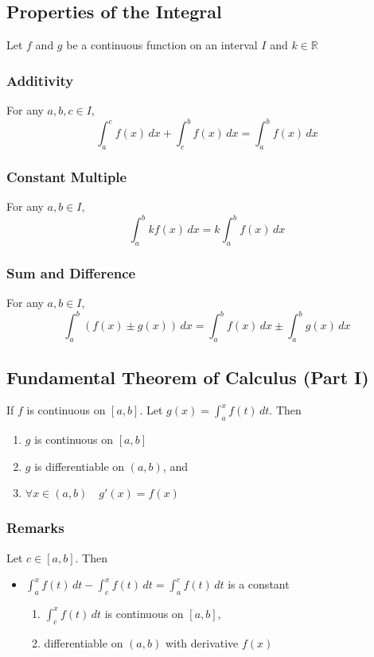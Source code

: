 \documentclass[../ma2002_notes.tex]{subfiles}
\begin{document}
\subsection{Properties of the Integral}
Let \(f\) and \(g\) be a continuous function on an interval \(I\) and \(k\in\mathbb{R}\)

\subsubsection{Additivity}
For any \(a,b,c\in I\),
\[\int_a^cf(x)\,dx+\int_c^bf(x)\,dx=\int_a^bf(x)\,dx\]

\subsubsection{Constant Multiple}
For any \(a,b\in I\),
\[\int_a^bkf(x)\,dx=k\int_a^bf(x)\,dx\]

\subsubsection{Sum and Difference}
For any \(a,b\in I\),
\[\int_a^b(f(x)\pm g(x))\,dx=\int_a^bf(x)\,dx\pm\int_a^bg(x)\,dx\]

\subsection{Fundamental Theorem of Calculus (Part I)}
If \(f\) is continuous on \([a,b]\). Let \(g(x)=\int_a^xf(t)\,dt\). Then
\begin{enumerate}
	\item\(g\) is continuous on \([a,b]\)
	\item\(g\) is differentiable on \((a,b)\), and
	\item\(\forall x\in(a,b)\quad g'(x)=f(x)\)
\end{enumerate}

\subsubsection{Remarks}
Let \(c\in[a,b]\). Then
\begin{itemize}
	\item\(\int_a^xf(t)\,dt-\int_c^xf(t)\,dt=\int_a^cf(t)\,dt\) is a constant
	\begin{enumerate}
		\item\(\int_c^xf(t)\,dt\) is continuous on \([a,b]\),
		\item differentiable on \((a,b)\) with derivative \(f(x)\)
	\end{enumerate}
\end{itemize}
\end{document}
